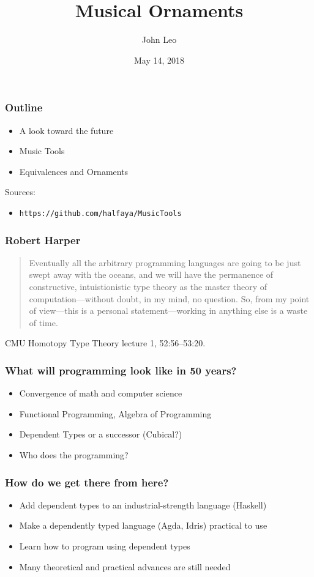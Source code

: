 \documentclass{beamer}
\title{Musical Ornaments}
\author{John Leo}
\institute{Halfaya Research}
\date{May 14, 2018}
\begin{document}
 
\frame{\titlepage}
 
\begin{frame}\frametitle{Outline}
\begin{itemize}
\item A look toward the future
\item Music Tools
\item Equivalences and Ornaments
\end{itemize}

\bigskip 
Sources:
\begin{itemize}
\item {\tt https://github.com/halfaya/MusicTools}
\end{itemize}
\end{frame}

\begin{frame}\frametitle{Robert Harper}
\begin{quote}
Eventually all the arbitrary programming languages are going to be just swept away with the oceans,
and we will have the permanence of constructive, intuistionistic type theory as the master theory
of computation---without doubt, in my mind, no question.  So, from my point of view---this is a personal
statement---working in anything else is a waste of time.
\end{quote}

CMU Homotopy Type Theory lecture 1, 52:56--53:20.
\end{frame}

\begin{frame}\frametitle{What will programming look like in 50 years?}
\begin{itemize}
\item Convergence of math and computer science
\item Functional Programming, Algebra of Programming
\item Dependent Types or a successor (Cubical?)
\item Who does the programming?
\end{itemize}
\end{frame}

\begin{frame}\frametitle{How do we get there from here?}
\begin{itemize}
\item Add dependent types to an industrial-strength language (Haskell)
\item Make a dependently typed language (Agda, Idris) practical to use
\item Learn how to program using dependent types
\item Many theoretical and practical advances are still needed
\end{itemize}
\end{frame}
\end{document}
